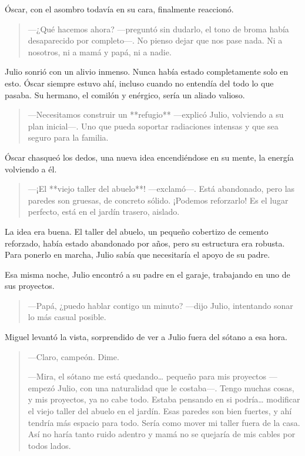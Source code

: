 \documentclass[a4paper,12pt]{book}
\begin{document}
Óscar, con el asombro todavía en su cara, finalmente reaccionó.

\begin{quote}
    —¿Qué hacemos ahora? —preguntó sin dudarlo, el tono de broma había desaparecido por completo—. No pienso dejar que nos pase nada. Ni a nosotros, ni a mamá y papá, ni a nadie.
\end{quote}

Julio sonrió con un alivio inmenso. Nunca había estado completamente solo en esto. Óscar siempre estuvo ahí, incluso cuando no entendía del todo lo que pasaba. Su hermano, el comilón y enérgico, sería un aliado valioso.

\begin{quote}
    —Necesitamos construir un **refugio** —explicó Julio, volviendo a su plan inicial—. Uno que pueda soportar radiaciones intensas y que sea seguro para la familia.
\end{quote}

Óscar chasqueó los dedos, una nueva idea encendiéndose en su mente, la energía volviendo a él.

\begin{quote}
    —¡El **viejo taller del abuelo**! —exclamó—. Está abandonado, pero las paredes son gruesas, de concreto sólido. ¡Podemos reforzarlo! Es el lugar perfecto, está en el jardín trasero, aislado.
\end{quote}

La idea era buena. El taller del abuelo, un pequeño cobertizo de cemento reforzado, había estado abandonado por años, pero su estructura era robusta. Para ponerlo en marcha, Julio sabía que necesitaría el apoyo de su padre.

Esa misma noche, Julio encontró a su padre en el garaje, trabajando en uno de sus proyectos.

\begin{quote}
    —Papá, ¿puedo hablar contigo un minuto? —dijo Julio, intentando sonar lo más casual posible.
\end{quote}

Miguel levantó la vista, sorprendido de ver a Julio fuera del sótano a esa hora.

\begin{quote}
    —Claro, campeón. Dime.

    —Mira, el sótano me está quedando… pequeño para mis proyectos —empezó Julio, con una naturalidad que le costaba—. Tengo muchas cosas, y mis proyectos, ya no cabe todo. Estaba pensando en si podría… modificar el viejo taller del abuelo en el jardín. Esas paredes son bien fuertes, y ahí tendría más espacio para todo. Sería como mover mi taller fuera de la casa. Así no haría tanto ruido adentro y mamá no se quejaría de mis cables por todos lados.
\end{quote}
\end{document}
